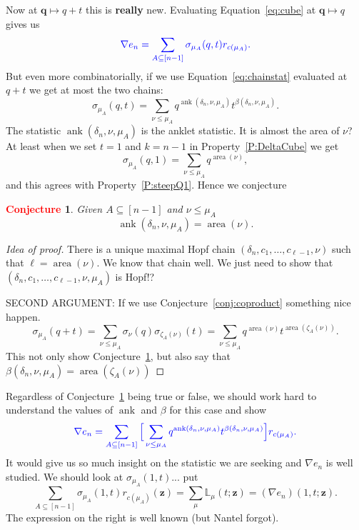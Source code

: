 \documentclass[12pt]{amsart}
\newcommand{\blue}[1]{\textcolor{blue}{#1}}
\newcommand{\red}[1]{\textcolor{red}{#1}}
\newcommand{\green}[1]{\textcolor{green!75!black}{#1}}
\theoremstyle{plain}
\newtheorem{conjecture}{\red{Conjecture}}
\theoremstyle{definition}
\theoremstyle{remark}
\newcommand{\Qvar}{{\bm q}}
\newcommand{\Zvar}{{\bm z}}
\newcommand\area{\mathop{\mathrm{area}}}
\newcommand{\ank}{\mathop{\mathrm{ank}}}
\begin{document}
Now at $\Qvar\mapsto q+t$ this is {\bf really} new. Evaluating Equation~\eqref{eq:cube} at $\Qvar\mapsto q$ gives us
\begin{equation}\label{eq:onevar}
\blue{
\nabla e_n= \sum_{A\subseteq[n-1]} \sigma_{\mu_A}(q,t) r_{c(\mu_A)}.
}
\end{equation}
But even more combinatorially, if we use Equation~\eqref{eq:chainstat} evaluated at $q+t$ we get at most the two chains:
\begin{equation}\label{eq:onevar}
\sigma_{\mu_A}(q,t) = \sum_{\nu\le \mu_A} q^{\ank(\delta_n,\nu,\mu_A)} t^{\beta(\delta_n,\nu,\mu_A)}.
\end{equation}
The statistic $\ank(\delta_n,\nu,\mu_A)$ is the anklet statistic. It is almost the area of $\nu$? At least when we set $t=1$ and $k=n-1$ in Property~\ref{P:DeltaCube} we get
\[
\sigma_{\mu_A}(q,1)=\sum_{\nu\le\mu_A} q^{\area(\nu)},
\]
and this agrees with Property~\ref{P:steepQ1}. Hence we conjecture
\begin{conjecture}\label{conj:area}
Given $A\subseteq[n-1]$ and $\nu\le \mu_A$
\[
\ank(\delta_n,\nu,\mu_A)=\area(\nu).
\]
\end{conjecture}

\begin{proof}[Idea of proof]
There is a unique maximal Hopf chain $(\delta_n,c_1,\ldots,c_{\ell-1},\nu)$ such that $\ell=\area(\nu)$.
We know that chain well.
We just need to show that $(\delta_n,c_1,\ldots,c_{\ell-1},\nu,\mu_A)$ is Hopf!?

\green{SECOND ARGUMENT}: If we use Conjecture~\ref{conj:coproduct} something nice happen. 
\[
\sigma_{\mu_A}(q+t) = \sum_{\nu\le \mu_A} \sigma_\nu(q) \sigma_{\zeta_A(\nu)}(t) = \sum_{\nu\le \mu_A} q^{\area(\nu)} t^{\area(\zeta_A(\nu))}.
\]
This not only show Conjecture~\ref{conj:area}, \green{but also say that $\beta(\delta_n,\nu,\mu_A)=\area(\zeta_A(\nu))$}
\end{proof}

Regardless of Conjecture~\ref{conj:area} being true or false, we should work hard to understand the values of $\ank$ and $\beta$ for this case and show 
\begin{equation}\label{eq:onevar}
\blue{
\nabla e_n= \sum_{A\subseteq[n-1]} \Big[\sum_{\nu\le \mu_A} q^{\ank(\delta_n,\nu,\mu_A)} t^{\beta(\delta_n,\nu,\mu_A)}\Big] r_{c(\mu_A)}.
}
\end{equation}
It would give us so much insight on the statistic we are seeking and $\nabla e_n$ is well studied. We should look at $\sigma_{\mu_A}(1,t)$...
put
\[
\sum_{A\subseteq[n-1]} \sigma_{\mu_A}(1,t) r_{c(\mu_A)}(\Zvar) = \sum_{\mu} {\mathbb L}_\mu(t;\Zvar) = (\nabla e_n)(1,t;\Zvar).
\]
The expression on the right is well known (but Nantel forgot).
\end{document}
